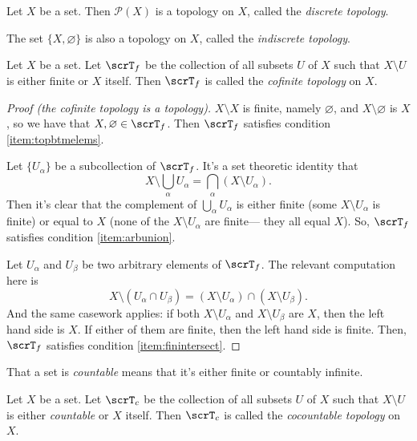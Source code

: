 \documentclass{article}
\begin{document}
\begin{example}
    Let $X$ be a set.
    Then $\mathscr{P}(X)$ is a topology on $X$, called the \textit{discrete topology}.

    The set $\{X, \varnothing\}$ is also a topology on $X$, called the \textit{indiscrete topology}.
\end{example}

\begin{example}
    Let $X$ be a set.
    Let $\scrT_f$ be the collection of all subsets $U$ of $X$ such that $X \setminus U$ is either finite or $X$ itself.
    Then $\scrT_f$ is called the \textit{cofinite topology} on $X$.
\end{example}

\begin{proof}[Proof (the cofinite topology is a topology)]
    $X \setminus X$ is finite, namely $\varnothing$, and $X \setminus \varnothing$ is $X$, so we have that $X, \varnothing \in \scrT_f$.
    Then $\scrT_f$ satisfies condition \ref{item:topbtmelems}.

    Let $\{U_\alpha\}$ be a subcollection of $\scrT_f$.
    It's a set theoretic identity that
    \[
        X \setminus \bigcup_\alpha U_\alpha = \bigcap_\alpha (X \setminus U_\alpha).
    \]
    Then it's clear that the complement of $\bigcup_\alpha U_\alpha$ is either finite (some $X \setminus U_\alpha$ is finite) or equal to $X$ (none of the $X \setminus U_\alpha$ are finite--- they all equal $X$).
    So, $\scrT_f$ satisfies condition \ref{item:arbunion}.


    Let $U_\alpha$ and $U_\beta$ be two arbitrary elements of $\scrT_f$.
    The relevant computation here is 
    \[
        X \setminus (U_\alpha \cap U_\beta) =  (X \setminus U_\alpha) \cap (X \setminus U_\beta).
    \]
    And the same casework applies: if both $X \setminus U_\alpha$ and $X \setminus U_\beta$ are $X$, then the left hand side is $X$. 
    If either of them are finite, then the left hand side is finite.
    Then, $\scrT_f$ satisfies condition \ref{item:finintersect}.
\end{proof}

\begin{convention}
    That a set is \textit{countable} means that it's either finite or countably infinite.
\end{convention}

\begin{example}\label{ex:cocountabletop}
    Let $X$ be a set.
    Let $\scrT_c$ be the collection of all subsets $U$ of $X$ such that $X \setminus U$ is either \textit{countable} or $X$ itself.
    Then $\scrT_c$ is called the \textit{cocountable topology} on $X$.
\end{example}
\end{document}
